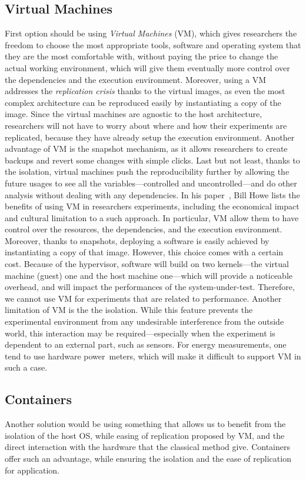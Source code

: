 \subsection{Virtual Machines}
First option should be using \emph{Virtual Machines} (VM), which gives researchers the freedom to choose the most appropriate tools, software and operating system that they are the most comfortable with, without paying the price to change the actual working environment, which will give them eventually more control over the dependencies and the execution environment.
Moreover, using a VM addresses the \emph{replication crisis} thanks to the virtual images, as even the most complex architecture can be reproduced easily by instantiating a copy of the image.
Since the virtual machines are agnostic to the host architecture, researchers will not have to worry about where and how their experiments are replicated, because they have already setup the execution environment.
Another advantage of VM is the snapshot mechanism, as it allows researchers to create backups and revert some changes with simple clicks. 
Last but not least, thanks to the isolation, virtual machines push the reproducibility further by allowing the future usages to see all the variables---controlled and uncontrolled---and do other analysis without dealing with any dependencies.
In his paper~\cite{howe_virtual_2012}, Bill Howe lists the benefits of using VM in researchers experiments, including the economical impact and cultural limitation to a such approach.
In particular, VM allow them to have control over the resources, the dependencies, and the execution environment.
Moreover, thanks to snapshots, deploying a software is easily achieved by instantiating a copy of that image.
However, this choice comes with a certain cost.
Because of the hypervisor, software will build on two kernels---the virtual machine (guest) one and the host machine one---which will provide a noticeable overhead, and will impact the performances of the system-under-test.
Therefore, we cannot use VM for experiments that are related to performance.
Another limitation of VM is the the isolation.
While this feature prevents the experimental environment from any undesirable interference from the outside world, this interaction may be required---especially when the experiment is dependent to an external part, such as sensors.
For energy measurements, one tend to use hardware power~meters, which will make it difficult to support VM in such a case.

\subsection{Containers}
Another solution would be using something that allows us to benefit from the isolation of the host OS, while easing of replication proposed by VM, and the direct interaction with the hardware that the classical method give.
Containers offer such an advantage, while ensuring the isolation and the ease of replication for application.

